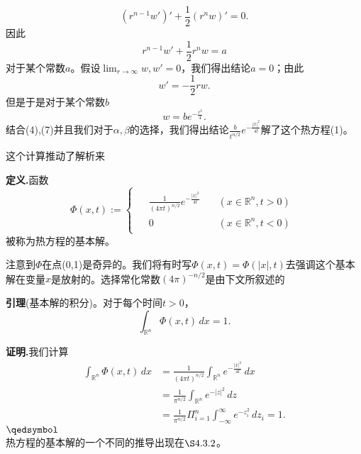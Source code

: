 \documentclass[leqno]{article}
\numberwithin{equation}{subsection}%
\begin{document}
\begin{equation*}
(r^{n-1}w')'+\frac{1}{2}(r^{n}w)'=0.
\end{equation*}
因此
\begin{equation*}
r^{n-1}w'+\frac{1}{2}r^{n}w=a
\end{equation*}
对于某个常数$a$。假设$\lim_{r\rightarrow \infty}w,w'=0$，我们得出结论$a=0$；由此
\begin{equation*}
w'=-\frac{1}{2}rw.
\end{equation*}
但是于是对于某个常数$b$
\begin{equation}
w=be^{-\frac{r^{2}}{4}}.
\end{equation}
结合(4),(7)并且我们对于$\alpha,\beta$的选择，我们得出结论$\frac{b}{t^{n/2}}e^{-\frac{|x|^{2}}{4t}}$解了这个热方程(1)。
\par
这个计算推动了解析来
\par
\noindent\textbf{定义.}函数
\begin{equation*}
\Phi(x,t):=
\begin{cases}
\begin{aligned}
&\frac{1}{(4\pi t)^{n/2}}e^{-\frac{|x|^{2}}{4t}}\quad&(x\in\mathbb{R}^{n},t>0)\\
&0&(x\in\mathbb{R}^{n},t<0)
\end{aligned}
\end{cases}
\end{equation*}
被称为热方程的基本解。
\par
注意到$\Phi$在点(0,1)是奇异的。我们将有时写$\Phi(x,t)=\Phi(|x|,t)$去强调这个基本解在变量$x$是放射的。选择常化常数$(4\pi )^{-n/2}$是由下文所叙述的
\par
\noindent\textbf{引理}(基本解的积分)。对于每个时间$t>0$，
\begin{equation*}
\int_{\mathbb{R}^{n}}\Phi(x,t)\,dx=1.
\end{equation*}
\par
\noindent\textbf{证明.}我们计算
\begin{equation*}
\begin{aligned}
\int_{\mathbb{R}^{n}}\Phi(x,t)\,dx&=\frac{1}{(4\pi t)^{n/2}}\int_{\mathbb{R}^{n}}e^{-\frac{|x|^{2}}{4t}}\,dx\\
&=\frac{1}{\pi^{n/2}}\int_{\mathbb{R}^{n}}e^{-|z|^{2}}\,dz\\
&=\frac{1}{\pi^{n/2}}\Pi_{i=1}^{n}\int_{-\infty}^{\infty}e^{-z_{i}^{2}}\,dz_{i}=1.
\end{aligned}
\end{equation*}
$\hfill\qedsymbol$
\\热方程的基本解的一个不同的推导出现在$\S 4.3.2$。
\end{document}
